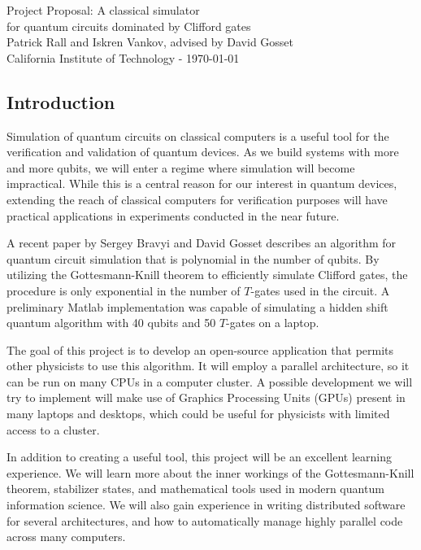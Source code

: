 \documentclass[11pt]{article}
\begin{document}
\begin{center}
    {\LARGE Project Proposal: A classical simulator\\ for quantum circuits dominated by Clifford gates }
\vspace{2mm}
{\large \\ Patrick Rall and Iskren Vankov, advised by David Gosset \\ California Institute of Technology -  \today}
\end{center}

\newenvironment{Figure}
  {\par\medskip\noindent\minipage{\linewidth}}
  {\endminipage\par\medskip}


\begin{multicols}{2}

\subsection*{Introduction}
Simulation of quantum circuits on classical computers is a useful tool for the verification and validation of quantum devices. As we build systems with more and more qubits, we will enter a regime where simulation will become impractical. While this is a central reason for our interest in quantum devices, extending the reach of classical computers for verification purposes will have practical applications in experiments conducted in the near future.

A recent paper by Sergey Bravyi and David Gosset \cite{bravyi-gosset} describes an algorithm for quantum circuit simulation that is polynomial in the number of qubits. By utilizing the Gottesmann-Knill theorem to efficiently simulate Clifford gates, the procedure is only exponential in the number of $T$-gates used in the circuit. A preliminary Matlab implementation was capable of simulating a hidden shift quantum algorithm with 40 qubits and 50 $T$-gates on a laptop.

The goal of this project is to develop an open-source application that permits other physicists to use this algorithm. It will employ a parallel architecture, so it can be run on many CPUs in a computer cluster. A possible development we will try to implement will make use of Graphics Processing Units (GPUs) present in many laptops and desktops, which could be useful for physicists with limited access to a cluster. 

In addition to creating a useful tool, this project will be an excellent learning experience. We will learn more about the inner workings of the Gottesmann-Knill theorem, stabilizer states, and mathematical tools used in modern quantum information science. We will also gain experience in writing distributed software for several architectures, and how to automatically manage highly parallel code across many computers. 



\end{multicols}
\end{document}
